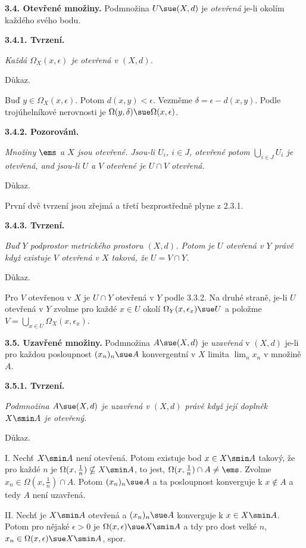 \documentclass[12pt]{article}
\begin{document}
{  \bigskip
  
  {\bf 3.4. Otevřené množiny.} Podmnožina $U\sue(X,d)$ je {\em otevřená} je-li okolím každého svého bodu.
  
  \medskip
  
  {\bf 3.4.1. Tvrzení.} {\em Každá $\Omega_X(x,\epsilon)$ je otevřená v $(X,d)$.
  
  Důkaz.} Buď $y\in\Omega_X(x,\epsilon)$. Potom $d(x,y)<\epsilon$. Vezměme $\delta=\epsilon-d(x,y)$. Podle  trojúhelníkové nerovnosti je $\Omega(y,\delta)\sue\Omega(x,\epsilon)$.\sq
  
  \medskip
  
  {\bf 3.4.2. Pozorov\'an\'\i.} {\em Množiny $\ems$ a $X$ jsou otevřené. Jsou-li $U_i$, $i\in J$, otevřené potom $\bigcup_{i\in J}U_i$ je otevřená, and jsou-li $U$ a $V$ otevřené je $U\cap V$ otevřená.
  
  Důkaz.} První dvě tvrzení jsou zřejmá a  třetí bezprostředně plyne z 2.3.1.\sq
  
  \medskip
  
  {\bf 3.4.3. Tvrzení.} {\em Buď $Y$ podprostor metrického prostoru $(X,d)$. Potom je $U$ otevřená v $Y$ právě kdy\v z existuje $V$ otevřená v $X$ taková, že $U=V\cap Y$.
  
  Důkaz.} Pro  $V$ otevřenou v $X$ je $U\cap Y$ otevřená v $Y$ podle 3.3.2. Na druhé straně, je-li $U$ otevřená v $Y$ zvolme pro každé $x\in U$ okolí $\Omega_Y(x,\epsilon_x)\sue U$ a položme $V=\bigcup_{x\in U}\Omega_X(x,\epsilon_x)$. \sq
  
  \bigskip
  
  {\bf 3.5. Uzavřené množiny.} Podmnožina $A\sue(X,d)$ je {\em uzavřená} v $(X,d)$ je-li pro každou posloupnost $(x_n)_n\sue A$ konvergentní v $X$ limita $\lim_nx_n$ v množině $A$.
  
  \medskip
  
  {\bf 3.5.1. Tvrzení.} {\em Podmnožina $A\sue(X,d)$ je {\em uzavřená} v $(X,d)$ právě když její doplněk $X\smin A$ je otevřený.
  
  Důkaz.} I. Nechť $X\smin A$ není otevřená. Potom  existuje bod $x\in X\smin A$ takový, že pro každé  $n$ je
  $\Omega(x,\frac1n)\nsubseteq X\smin A$, to jest, $\Omega(x,\frac1n)\cap A\neq\ems$. Zvolme $x_n\in
   \Omega(x,\frac1n)\cap A$. Potom $(x_n)_n\sue A$ a ta posloupnost konverguje k $x\notin A$ a tedy $A$ není uzavřená.
   
   \smallskip
   
  
   II. Nechť je $X\smin A$ otevřená a $(x_n)_n\sue A$  konverguje k $x\in X\smin A$. Potom pro nějaké $\epsilon>0$ je
   $\Omega(x,\epsilon)\sue X\smin A$ a tdy pro dost velké $n$, $x_n\in \Omega(x,\epsilon)\sue X\smin A$, spor. \sq
   
}
\end{document}
